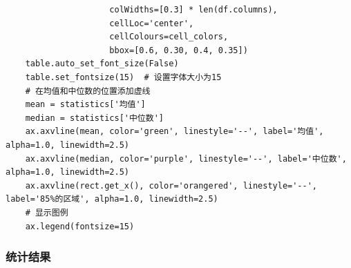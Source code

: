 \documentclass[lang=cn,11pt,a4paper]{elegantpaper}
\begin{document}
\begin{lstlisting}
                     colWidths=[0.3] * len(df.columns),
                     cellLoc='center',
                     cellColours=cell_colors,
                     bbox=[0.6, 0.30, 0.4, 0.35])
    table.auto_set_font_size(False)
    table.set_fontsize(15)  # 设置字体大小为15
    # 在均值和中位数的位置添加虚线
    mean = statistics['均值']
    median = statistics['中位数']
    ax.axvline(mean, color='green', linestyle='--', label='均值', alpha=1.0, linewidth=2.5)
    ax.axvline(median, color='purple', linestyle='--', label='中位数', alpha=1.0, linewidth=2.5)
    ax.axvline(rect.get_x(), color='orangered', linestyle='--', label='85%的区域', alpha=1.0, linewidth=2.5)
    # 显示图例
    ax.legend(fontsize=15)
\end{lstlisting}

\subsubsection{统计结果}
\end{document}
